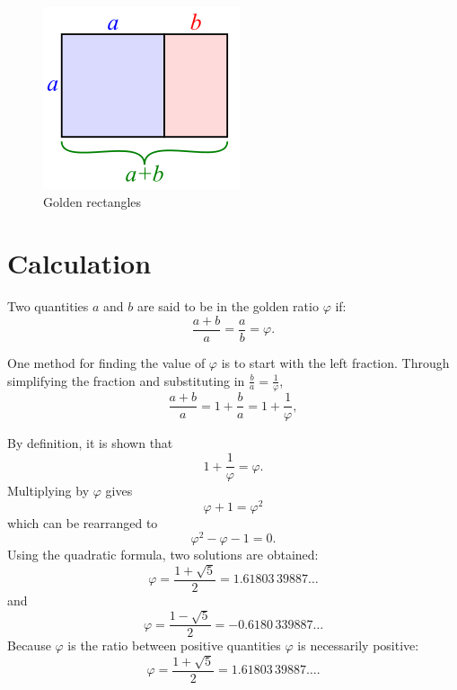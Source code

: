 \begin{figure}[p!]\centering
\includegraphics[width=.3\textwidth]{SimilarGoldenRectangles}
\caption{Golden rectangles}
\end{figure}



\section{Calculation}
Two quantities $a$ and $b$ are said to be in the golden ratio $\varphi$ if:
\begin{equation}
 \frac{a+b}{a} = \frac{a}{b} = \varphi.
\end{equation}

One method for finding the value of $\varphi$ is to start with the left fraction. Through simplifying the fraction and substituting in $\frac{b}{a} = \frac{1}{\varphi}$,
\begin{equation}
\frac{a+b}{a} = 1 + \frac{b}{a} = 1 + \frac{1}{\varphi},
\end{equation}

By definition, it is shown that
\begin{equation}
 1 + \frac{1}{\varphi} = \varphi. 
\end{equation}
Multiplying by $\varphi$ gives
\begin{equation*}
\varphi + 1 = \varphi^2
\end{equation*}
which can be rearranged to
\begin{equation*}
{\varphi}^2 - \varphi - 1 = 0.
\end{equation*}
Using the quadratic formula, two solutions are obtained:
\begin{equation*}
\varphi = \frac{1 + \sqrt{5}}{2} = 1.61803\,39887\dots
\end{equation*}
and
\begin{equation*}
\varphi = \frac{1 - \sqrt{5}}{2} = -0.6180\,339887\dots
\end{equation*}
Because $\varphi$ is the ratio between positive quantities $\varphi$ is necessarily positive:
\begin{equation*}
\varphi = \frac{1 + \sqrt{5}}{2} = 1.61803\,39887\dots .
\end{equation*}


